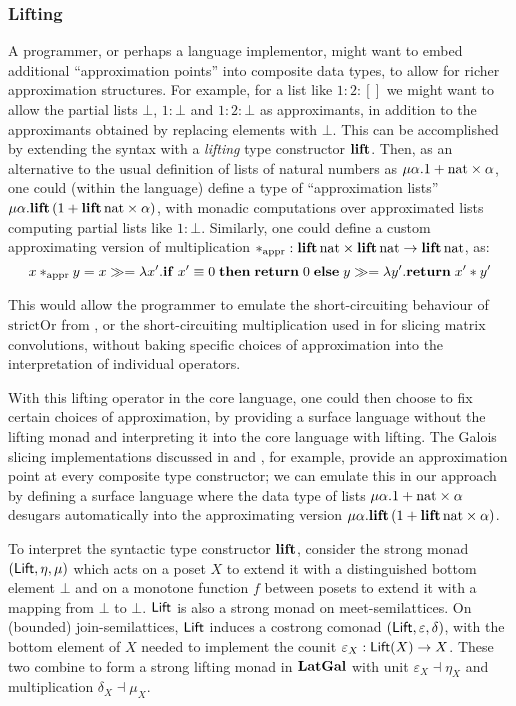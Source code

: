 \subsubsection{Lifting}

A programmer, or perhaps a language implementor, might want to embed additional ``approximation points'' into
composite data types, to allow for richer approximation structures. For example, for a list like $1 : 2 : []$
we might want to allow the partial lists $\bot$, $1 : \bot$ and $1 : 2 : \bot$ as approximants, in addition to
the approximants obtained by replacing elements with $\bot$. This can be accomplished by extending the syntax
with a \emph{lifting} type constructor $\mathbf{lift}$. Then, as an alternative to the usual definition of lists
of natural numbers as $\mu\alpha.1 + \mathrm{nat} \times \alpha$, one could (within the language) define a
type of ``approximation lists'' $\mu\alpha.\mathbf{lift}\,(1 + \mathbf{lift}\,\mathrm{nat} \times \alpha)$, with
monadic computations over approximated lists computing partial lists like $1 : \bot$. Similarly, one could
define a custom approximating version of multiplication $*_{\text{appr}}: \mathbf{lift}\,\mathrm{nat} \times
\mathbf{lift}\,\mathrm{nat} \to \mathbf{lift}\,\mathrm{nat}$, as:
\[x *_{\text{appr}} y = {x}\gg={\lambda x'.\mathbf{if}\;x' \equiv
0\;\mathbf{then}\;\mathbf{return}\;0\;\mathbf{else}\;{y}\gg={\lambda y'.\mathbf{return}\;x' * y'}}\]

\noindent This would allow the programmer to emulate the short-circuiting behaviour of $\mathrm{strictOr}$
from , or the short-circuiting multiplication used in \citet{perera22} for slicing
matrix convolutions, without baking specific choices of approximation into the interpretation of individual
operators.

With this lifting operator in the core language, one could then choose to fix certain choices of
approximation, by providing a surface language without the lifting monad and interpreting it into the core
language with lifting. The Galois slicing implementations discussed in \citet{perera12a} and
\citet{ricciotti17}, for example, provide an approximation point at every composite type constructor; we can
emulate this in our approach by defining a surface language where the data type of lists $\mu\alpha.1 +
\mathrm{nat} \times \alpha$ desugars automatically into the approximating version $\mu\alpha.\mathbf{lift}\,(1 +
\mathbf{lift}\,\mathrm{nat} \times \alpha)$.

To interpret the syntactic type constructor $\mathbf{lift}$, consider the strong monad $(\mathsf{Lift}, \eta, \mu)$ which
acts on a poset $X$ to extend it with a distinguished bottom element $\bot$ and on a monotone function $f$
between posets to extend it with a mapping from $\bot$ to $\bot$. $\mathsf{Lift}$ is also a strong monad on
meet-semilattices. On (bounded) join-semilattices, $\mathsf{Lift}$ induces a costrong comonad $(\mathsf{Lift}, \varepsilon,
\delta)$, with the bottom element of $X$ needed to implement the counit $\varepsilon_X: \mathsf{Lift}(X) \to X$. These
two combine to form a strong lifting monad in $\mathbf{LatGal}$ with unit $\varepsilon_X \dashv \eta_X$ and
multiplication $\delta_X \dashv \mu_X$.

